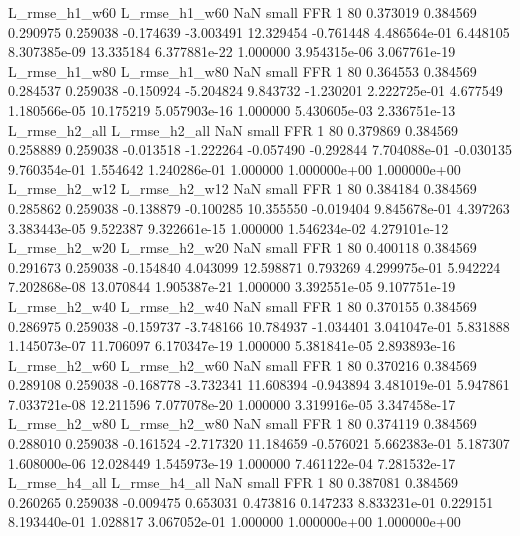  L_rmse_h1_w60  L_rmse_h1_w60                   NaN      small      FFR                 1 80 0.373019       0.384569 0.290975       0.259038   -0.174639     -3.003491     12.329454    -0.761448   4.486564e-01  6.448105 8.307385e-09    13.335184   6.377881e-22            1.000000    3.954315e-06        3.067761e-19
 L_rmse_h1_w80  L_rmse_h1_w80                   NaN      small      FFR                 1 80 0.364553       0.384569 0.284537       0.259038   -0.150924     -5.204824      9.843732    -1.230201   2.222725e-01  4.677549 1.180566e-05    10.175219   5.057903e-16            1.000000    5.430605e-03        2.336751e-13
 L_rmse_h2_all  L_rmse_h2_all                   NaN      small      FFR                 1 80 0.379869       0.384569 0.258889       0.259038   -0.013518     -1.222264     -0.057490    -0.292844   7.704088e-01 -0.030135 9.760354e-01     1.554642   1.240286e-01            1.000000    1.000000e+00        1.000000e+00
 L_rmse_h2_w12  L_rmse_h2_w12                   NaN      small      FFR                 1 80 0.384184       0.384569 0.285862       0.259038   -0.138879     -0.100285     10.355550    -0.019404   9.845678e-01  4.397263 3.383443e-05     9.522387   9.322661e-15            1.000000    1.546234e-02        4.279101e-12
 L_rmse_h2_w20  L_rmse_h2_w20                   NaN      small      FFR                 1 80 0.400118       0.384569 0.291673       0.259038   -0.154840      4.043099     12.598871     0.793269   4.299975e-01  5.942224 7.202868e-08    13.070844   1.905387e-21            1.000000    3.392551e-05        9.107751e-19
 L_rmse_h2_w40  L_rmse_h2_w40                   NaN      small      FFR                 1 80 0.370155       0.384569 0.286975       0.259038   -0.159737     -3.748166     10.784937    -1.034401   3.041047e-01  5.831888 1.145073e-07    11.706097   6.170347e-19            1.000000    5.381841e-05        2.893893e-16
 L_rmse_h2_w60  L_rmse_h2_w60                   NaN      small      FFR                 1 80 0.370216       0.384569 0.289108       0.259038   -0.168778     -3.732341     11.608394    -0.943894   3.481019e-01  5.947861 7.033721e-08    12.211596   7.077078e-20            1.000000    3.319916e-05        3.347458e-17
 L_rmse_h2_w80  L_rmse_h2_w80                   NaN      small      FFR                 1 80 0.374119       0.384569 0.288010       0.259038   -0.161524     -2.717320     11.184659    -0.576021   5.662383e-01  5.187307 1.608000e-06    12.028449   1.545973e-19            1.000000    7.461122e-04        7.281532e-17
 L_rmse_h4_all  L_rmse_h4_all                   NaN      small      FFR                 1 80 0.387081       0.384569 0.260265       0.259038   -0.009475      0.653031      0.473816     0.147233   8.833231e-01  0.229151 8.193440e-01     1.028817   3.067052e-01            1.000000    1.000000e+00        1.000000e+00
